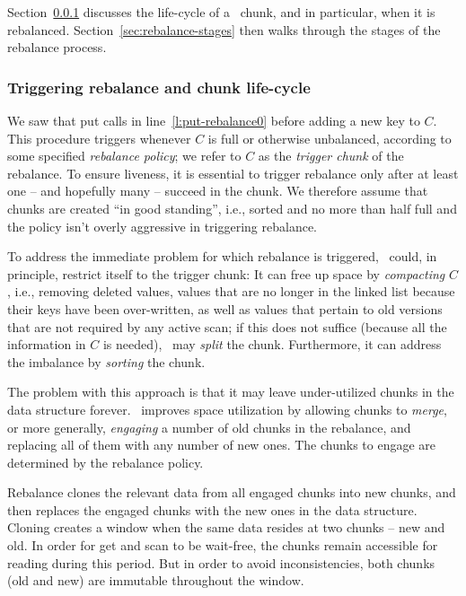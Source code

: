Section~\ref{sec:rebalance-trigger} discusses the life-cycle of a \kiwi\ chunk, and in particular,
when it is rebalanced. Section~\ref{sec:rebalance-stages} then walks through the stages of the rebalance process.

\subsubsection{Triggering rebalance and chunk life-cycle}
\label{sec:rebalance-trigger}

We saw that put calls  in line~\ref{l:put-rebalance0}  before adding a new key to $C$.
This procedure triggers  whenever $C$ is full or otherwise unbalanced, according
to some specified \emph{rebalance policy}; we refer to $C$ as the \emph{trigger chunk} of the rebalance.
To ensure liveness, it is essential to trigger rebalance only after at least one  -- and hopefully many  -- succeed in the chunk.
We therefore assume that chunks are created ``in good standing'', i.e., sorted and no more than half full and the policy isn't overly aggressive
in triggering rebalance. 

To address the immediate problem for which rebalance is triggered, \kiwi\ could, in principle, restrict itself to the trigger chunk:
It can free up space by \emph{compacting} $C$, i.e., removing deleted values, values that are no longer in the linked list
because their keys have been over-written, as well as values that pertain to old versions that are not required by any active scan;
if this does not suffice (because all the information in $C$ is needed), \kiwi\ may \emph{split} the chunk.
Furthermore, it can address the imbalance  by \emph{sorting} the chunk.

The problem with this approach is that it may leave under-utilized chunks in the data structure forever.
\kiwi\ improves space utilization by allowing chunks to \emph{merge}, or more generally,
\emph{engaging} a number of old chunks in the rebalance,
and replacing all of them with any number of new ones.
The chunks to engage are determined by the rebalance policy.

Rebalance clones the relevant data from all engaged chunks  into new chunks, and then
replaces the engaged chunks with the new ones in the data structure.
Cloning creates a window when the same data resides at two chunks -- new and old.
In order for get and scan to be wait-free, the chunks remain accessible for reading during this period.
But in order to avoid inconsistencies, both chunks (old and new) are immutable throughout the window.


